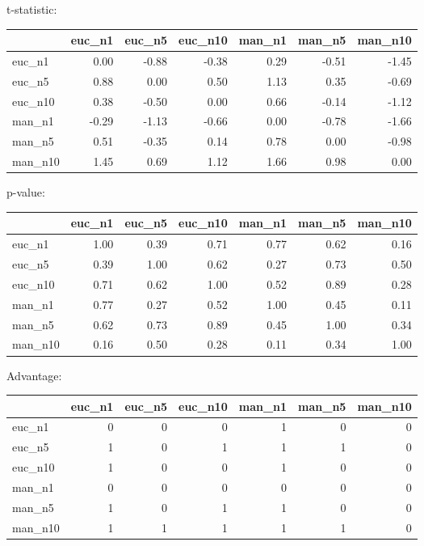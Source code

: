 t-statistic:
 \begin{tabular}{lrrrrrr}
\hline
         &   euc\_n1 &   euc\_n5 &   euc\_n10 &   man\_n1 &   man\_n5 &   man\_n10 \\
\hline
 euc\_n1  &     0.00 &    -0.88 &     -0.38 &     0.29 &    -0.51 &     -1.45 \\
 euc\_n5  &     0.88 &     0.00 &      0.50 &     1.13 &     0.35 &     -0.69 \\
 euc\_n10 &     0.38 &    -0.50 &      0.00 &     0.66 &    -0.14 &     -1.12 \\
 man\_n1  &    -0.29 &    -1.13 &     -0.66 &     0.00 &    -0.78 &     -1.66 \\
 man\_n5  &     0.51 &    -0.35 &      0.14 &     0.78 &     0.00 &     -0.98 \\
 man\_n10 &     1.45 &     0.69 &      1.12 &     1.66 &     0.98 &      0.00 \\
\hline
\end{tabular} 

p-value:
 \begin{tabular}{lrrrrrr}
\hline
         &   euc\_n1 &   euc\_n5 &   euc\_n10 &   man\_n1 &   man\_n5 &   man\_n10 \\
\hline
 euc\_n1  &     1.00 &     0.39 &      0.71 &     0.77 &     0.62 &      0.16 \\
 euc\_n5  &     0.39 &     1.00 &      0.62 &     0.27 &     0.73 &      0.50 \\
 euc\_n10 &     0.71 &     0.62 &      1.00 &     0.52 &     0.89 &      0.28 \\
 man\_n1  &     0.77 &     0.27 &      0.52 &     1.00 &     0.45 &      0.11 \\
 man\_n5  &     0.62 &     0.73 &      0.89 &     0.45 &     1.00 &      0.34 \\
 man\_n10 &     0.16 &     0.50 &      0.28 &     0.11 &     0.34 &      1.00 \\
\hline
\end{tabular} 

Advantage:
 \begin{tabular}{lrrrrrr}
\hline
         &   euc\_n1 &   euc\_n5 &   euc\_n10 &   man\_n1 &   man\_n5 &   man\_n10 \\
\hline
 euc\_n1  &        0 &        0 &         0 &        1 &        0 &         0 \\
 euc\_n5  &        1 &        0 &         1 &        1 &        1 &         0 \\
 euc\_n10 &        1 &        0 &         0 &        1 &        0 &         0 \\
 man\_n1  &        0 &        0 &         0 &        0 &        0 &         0 \\
 man\_n5  &        1 &        0 &         1 &        1 &        0 &         0 \\
 man\_n10 &        1 &        1 &         1 &        1 &        1 &         0 \\
\hline
\end{tabular} 

